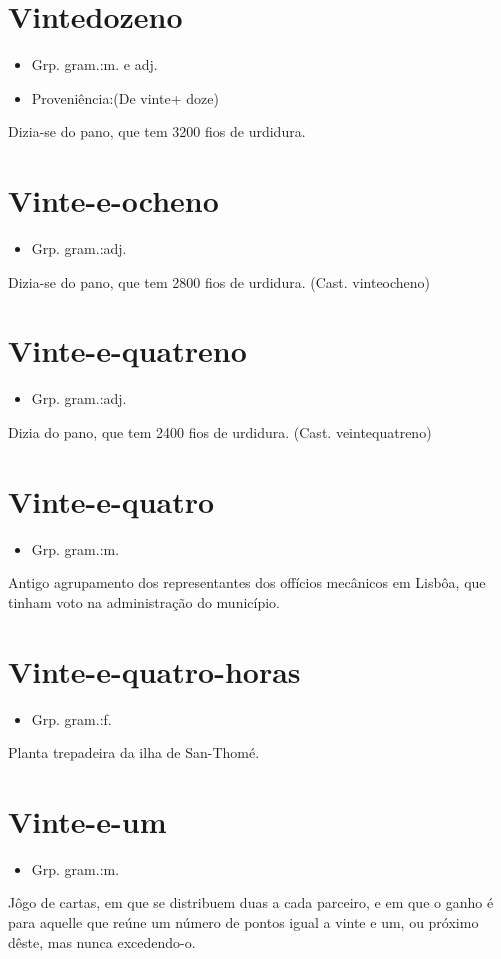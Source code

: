 \documentclass{article}
\begin{document}
\section{Vintedozeno}
\begin{itemize}
\item {Grp. gram.:m.  e  adj.}
\end{itemize}
\begin{itemize}
\item {Proveniência:(De \textunderscore vinte\textunderscore  + \textunderscore doze\textunderscore )}
\end{itemize}
Dizia-se do pano, que tem 3200 fios de urdidura.
\section{Vinte-e-ocheno}
\begin{itemize}
\item {Grp. gram.:adj.}
\end{itemize}
Dizia-se do pano, que tem 2800 fios de urdidura.
(Cast. \textunderscore vinteocheno\textunderscore )
\section{Vinte-e-quatreno}
\begin{itemize}
\item {Grp. gram.:adj.}
\end{itemize}
Dizia do pano, que tem 2400 fios de urdidura.
(Cast. \textunderscore veintequatreno\textunderscore )
\section{Vinte-e-quatro}
\begin{itemize}
\item {Grp. gram.:m.}
\end{itemize}
Antigo agrupamento dos representantes dos offícios mecânicos em Lisbôa, que tinham voto na administração do município.
\section{Vinte-e-quatro-horas}
\begin{itemize}
\item {Grp. gram.:f.}
\end{itemize}
Planta trepadeira da ilha de San-Thomé.
\section{Vinte-e-um}
\begin{itemize}
\item {Grp. gram.:m.}
\end{itemize}
Jôgo de cartas, em que se distribuem duas a cada parceiro, e em que o ganho é para aquelle que reúne um número de pontos igual a vinte e um, ou próximo dêste, mas nunca excedendo-o.
\end{document}
